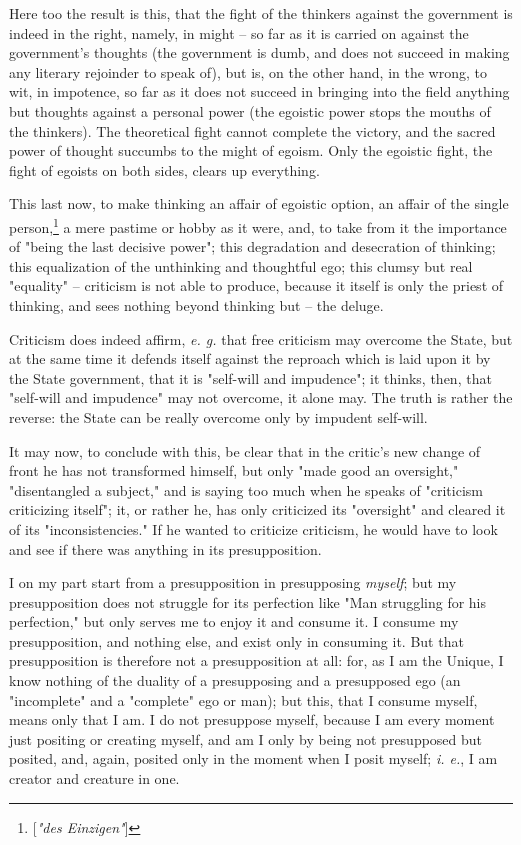 Here too the result is this, that the fight of the thinkers against the 
government is indeed in the right, namely, in might -- so far as it is carried 
on against the government's thoughts (the government is dumb, and does not 
succeed in making any literary rejoinder to speak of), but is, on the other 
hand, in the wrong, to wit, in impotence, so far as it does not succeed in 
bringing into the field anything but thoughts against a personal power (the 
egoistic power stops the mouths of the thinkers). The theoretical fight cannot 
complete the victory, and the sacred power of thought succumbs to the might of 
egoism. Only the egoistic fight, the fight of egoists on both sides, clears up 
everything.

This last now, to make thinking an affair of egoistic option, an affair of the 
single person,\footnote{[\textit{"{}des Einzigen"{}}]} a mere pastime or hobby 
as it were, and, to take from it the importance of "{}being the last decisive 
power"{}; this degradation and desecration of thinking; this equalization of 
the unthinking and thoughtful ego; this clumsy but real "{}equality"{} -- 
criticism is not able to produce, because it itself is only the priest of 
thinking, and sees nothing beyond thinking but -- the deluge.

Criticism does indeed affirm, \textit{e. g.} that free criticism may overcome 
the State, but at the same time it defends itself against the reproach which 
is laid upon it by the State government, that it is "{}self-will and 
impudence"{}; it thinks, then, that "{}self-will and impudence"{} may not 
overcome, it alone may. The truth is rather the reverse: the State can be 
really overcome only by impudent self-will.

It may now, to conclude with this, be clear that in the critic's new change of 
front he has not transformed himself, but only "{}made good an oversight,"{} 
"{}disentangled a subject,"{} and is saying too much when he speaks of 
"{}criticism criticizing itself"{}; it, or rather he, has only criticized its 
"{}oversight"{} and cleared it of its "{}inconsistencies."{} If he wanted to 
criticize criticism, he would have to look and see if there was anything in 
its presupposition.

I on my part start from a presupposition in presupposing \textit{myself}; but 
my presupposition does not struggle for its perfection like "{}Man struggling 
for his perfection,"{} but only serves me to enjoy it and consume it. I 
consume my presupposition, and nothing else, and exist only in consuming it. 
But that presupposition is therefore not a presupposition at all: for, as I am 
the Unique, I know nothing of the duality of a presupposing and a presupposed 
ego (an "{}incomplete"{} and a "{}complete"{} ego or man); but this, that I 
consume myself, means only that I am. I do not presuppose myself, because I am 
every moment just positing or creating myself, and am I only by being not 
presupposed but posited, and, again, posited only in the moment when I posit 
myself; \textit{i. e.}, I am creator and creature in one.

